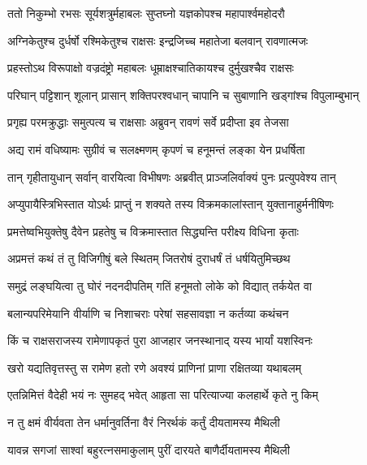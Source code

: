 
\twolineshloka
{ततो निकुम्भो रभसः सूर्यशत्रुर्महाबलः}
{सुप्तघ्नो यज्ञकोपश्च महापार्श्वमहोदरौ} %

\twolineshloka
{अग्निकेतुश्च दुर्धर्षो रश्मिकेतुश्च राक्षसः}
{इन्द्रजिच्च महातेजा बलवान् रावणात्मजः} %

\twolineshloka
{प्रहस्तोऽथ विरूपाक्षो वज्रदंष्ट्रो महाबलः}
{धूम्राक्षश्चातिकायश्च दुर्मुखश्चैव राक्षसः} %

\twolineshloka
{परिघान् पट्टिशान् शूलान् प्रासान् शक्तिपरश्वधान्}
{चापानि च सुबाणानि खड्गांश्च विपुलाम्बुभान्} %

\twolineshloka
{प्रगृह्य परमक्रुद्धाः समुत्पत्य च राक्षसाः}
{अब्रुवन् रावणं सर्वे प्रदीप्ता इव तेजसा} %

\twolineshloka
{अद्य रामं वधिष्यामः सुग्रीवं च सलक्ष्मणम्}
{कृपणं च हनूमन्तं लङ्का येन प्रधर्षिता} %

\twolineshloka
{तान् गृहीतायुधान् सर्वान् वारयित्वा विभीषणः}
{अब्रवीत् प्राञ्जलिर्वाक्यं पुनः प्रत्युपवेश्य तान्} %

\twolineshloka
{अप्युपायैस्त्रिभिस्तात योऽर्थः प्राप्तुं न शक्यते}
{तस्य विक्रमकालांस्तान् युक्तानाहुर्मनीषिणः} %

\twolineshloka
{प्रमत्तेष्वभियुक्तेषु दैवेन प्रहतेषु च}
{विक्रमास्तात सिद्ध्यन्ति परीक्ष्य विधिना कृताः} %

\twolineshloka
{अप्रमत्तं कथं तं तु विजिगीषुं बले स्थितम्}
{जितरोषं दुराधर्षं तं धर्षयितुमिच्छथ} %

\twolineshloka
{समुद्रं लङ्घयित्वा तु घोरं नदनदीपतिम्}
{गतिं हनूमतो लोके को विद्यात् तर्कयेत वा} %

\twolineshloka
{बलान्यपरिमेयानि वीर्याणि च निशाचराः}
{परेषां सहसावज्ञा न कर्तव्या कथंचन} %

\twolineshloka
{किं च राक्षसराजस्य रामेणापकृतं पुरा}
{आजहार जनस्थानाद् यस्य भार्यां यशस्विनः} %

\twolineshloka
{खरो यद्यतिवृत्तस्तु स रामेण हतो रणे}
{अवश्यं प्राणिनां प्राणा रक्षितव्या यथाबलम्} %

\twolineshloka
{एतन्निमित्तं वैदेही भयं नः सुमहद् भवेत्}
{आहृता सा परित्याज्या कलहार्थे कृते नु किम्} %

\twolineshloka
{न तु क्षमं वीर्यवता तेन धर्मानुवर्तिना}
{वैरं निरर्थकं कर्तुं दीयतामस्य मैथिली} %

\twolineshloka
{यावन्न सगजां साश्वां बहुरत्नसमाकुलाम्}
{पुरीं दारयते बाणैर्दीयतामस्य मैथिली} %

